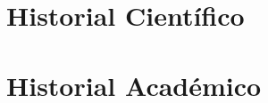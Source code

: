 \documentclass[12pt,a4paper]{report}
\begin{document}
\makeatletter
\def\@makechapterhead#1{%
  \vspace*{50\p@}%
  {\parindent \z@ \raggedright \normalfont
    \interlinepenalty\@M
    \Huge \bfseries #1\par\nobreak
    \vskip 40\p@
  }}
  \makeatother




%    
%    




\clearpage

\chapter{Historial Científico}


\chapter{Historial Académico}





%
\end{document}
